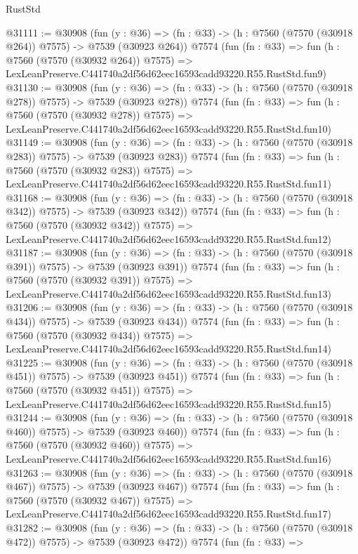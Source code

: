 \begin{lexlean}{RustStd}
\begin{coremodule}
@31111 := @30908
    (fun (y : @36) => (fn : @33) -> (h : @7560 (@7570 (@30918 @264)) @7575) -> @7539 (@30923 @264))
    @7574
    (fun (fn : @33) =>
    fun (h : @7560 (@7570 (@30932 @264)) @7575) =>
    LexLeanPreserve.C441740a2df56d62eec16593cadd93220.R55.RustStd.fun9)
@31130 := @30908
    (fun (y : @36) => (fn : @33) -> (h : @7560 (@7570 (@30918 @278)) @7575) -> @7539 (@30923 @278))
    @7574
    (fun (fn : @33) =>
    fun (h : @7560 (@7570 (@30932 @278)) @7575) =>
    LexLeanPreserve.C441740a2df56d62eec16593cadd93220.R55.RustStd.fun10)
@31149 := @30908
    (fun (y : @36) => (fn : @33) -> (h : @7560 (@7570 (@30918 @283)) @7575) -> @7539 (@30923 @283))
    @7574
    (fun (fn : @33) =>
    fun (h : @7560 (@7570 (@30932 @283)) @7575) =>
    LexLeanPreserve.C441740a2df56d62eec16593cadd93220.R55.RustStd.fun11)
@31168 := @30908
    (fun (y : @36) => (fn : @33) -> (h : @7560 (@7570 (@30918 @342)) @7575) -> @7539 (@30923 @342))
    @7574
    (fun (fn : @33) =>
    fun (h : @7560 (@7570 (@30932 @342)) @7575) =>
    LexLeanPreserve.C441740a2df56d62eec16593cadd93220.R55.RustStd.fun12)
@31187 := @30908
    (fun (y : @36) => (fn : @33) -> (h : @7560 (@7570 (@30918 @391)) @7575) -> @7539 (@30923 @391))
    @7574
    (fun (fn : @33) =>
    fun (h : @7560 (@7570 (@30932 @391)) @7575) =>
    LexLeanPreserve.C441740a2df56d62eec16593cadd93220.R55.RustStd.fun13)
@31206 := @30908
    (fun (y : @36) => (fn : @33) -> (h : @7560 (@7570 (@30918 @434)) @7575) -> @7539 (@30923 @434))
    @7574
    (fun (fn : @33) =>
    fun (h : @7560 (@7570 (@30932 @434)) @7575) =>
    LexLeanPreserve.C441740a2df56d62eec16593cadd93220.R55.RustStd.fun14)
@31225 := @30908
    (fun (y : @36) => (fn : @33) -> (h : @7560 (@7570 (@30918 @451)) @7575) -> @7539 (@30923 @451))
    @7574
    (fun (fn : @33) =>
    fun (h : @7560 (@7570 (@30932 @451)) @7575) =>
    LexLeanPreserve.C441740a2df56d62eec16593cadd93220.R55.RustStd.fun15)
@31244 := @30908
    (fun (y : @36) => (fn : @33) -> (h : @7560 (@7570 (@30918 @460)) @7575) -> @7539 (@30923 @460))
    @7574
    (fun (fn : @33) =>
    fun (h : @7560 (@7570 (@30932 @460)) @7575) =>
    LexLeanPreserve.C441740a2df56d62eec16593cadd93220.R55.RustStd.fun16)
@31263 := @30908
    (fun (y : @36) => (fn : @33) -> (h : @7560 (@7570 (@30918 @467)) @7575) -> @7539 (@30923 @467))
    @7574
    (fun (fn : @33) =>
    fun (h : @7560 (@7570 (@30932 @467)) @7575) =>
    LexLeanPreserve.C441740a2df56d62eec16593cadd93220.R55.RustStd.fun17)
@31282 := @30908
    (fun (y : @36) => (fn : @33) -> (h : @7560 (@7570 (@30918 @472)) @7575) -> @7539 (@30923 @472))
    @7574
    (fun (fn : @33) =>

\end{coremodule}
\end{lexlean}
